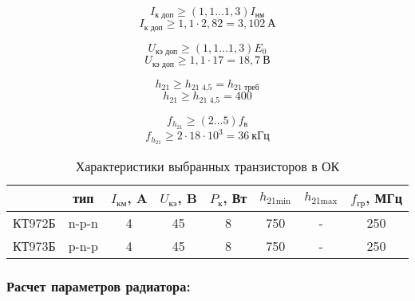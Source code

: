 \begin{equation}
\label{eq:equation2_8}
 I_{\text{к доп}}  \geq (1,1 \ldots 1,3) I_{\text{нм}}
\end{equation}
\begin{equation*}
 I_{\text{к доп}} \geq 1,1 \cdot 2,82 = 3,102 ~ \text{А}
\end{equation*}

\begin{equation}
\label{eq:equation2_9}
 U_{\text{кэ доп}}  \geq (1,1 \ldots 1,3) E_{\text{0}}
\end{equation}
\begin{equation*}
 U_{\text{кэ доп}} \geq 1,1 \cdot 17 = 18,7 ~ \text{В}
\end{equation*}

\begin{equation}
\label{eq:equation2_10}
 h_{21}  \geq h_{\text{21 4,5}} = h_{\text{21 треб}}
\end{equation}
\begin{equation*}
 h_{21}  \geq h_{\text{21 4,5}} = 400
\end{equation*}

\begin{equation}
\label{eq:equation2_11}
 f_{h_{21}}  \geq (2 \ldots 5) f_{\text{в}}
\end{equation}
\begin{equation*}
 f_{h_{21}}  \geq 2 \cdot 18\cdot 10^3 = 36 ~ \text{кГц}
\end{equation*}

\begin{table}[htbp]
\caption{Характеристики выбранных транзисторов в ОК}
\begin{center}\begin{tabular}{|c|c|c|c|c|c|c|c|}
\hline 
  & тип & $I_{\text{км}}$, A & $U_{\text{кэ}}$, B & $P_{\text{к}}$, Вт & $h_{\text{21min}}$ & $h_{\text{21max}}$ & $f_{\text{гр}}$, МГц \\ 
\hline 
КТ972Б & n-p-n & 4 & 45 & 8 & 750 & - & 250 \\ 
\hline 
КТ973Б & p-n-p & 4 & 45 & 8 & 750 & - & 250 \\ 
\hline 
\end{tabular} 
\end{center}
\end{table}

\subsubsection{Расчет параметров радиатора:}

